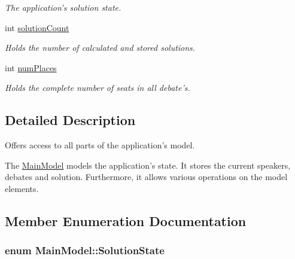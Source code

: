 \begin{DoxyCompactItemize}
\begin{DoxyCompactList}\small\item\em The application's solution state. \end{DoxyCompactList}\item 
\hypertarget{classMainModel_a8c4d8dc4d4aaea3046ab809fc5deffde}{int \hyperlink{classMainModel_a8c4d8dc4d4aaea3046ab809fc5deffde}{solution\-Count}}\label{classMainModel_a8c4d8dc4d4aaea3046ab809fc5deffde}

\begin{DoxyCompactList}\small\item\em Holds the number of calculated and stored solutions. \end{DoxyCompactList}\item 
\hypertarget{classMainModel_ac2724b25facf4662bb205425d8f5998e}{int \hyperlink{classMainModel_ac2724b25facf4662bb205425d8f5998e}{num\-Places}}\label{classMainModel_ac2724b25facf4662bb205425d8f5998e}

\begin{DoxyCompactList}\small\item\em Holds the complete number of seats in all debate's. \end{DoxyCompactList}\end{DoxyCompactItemize}


\subsection{Detailed Description}
Offers access to all parts of the application's model. 

The {\ttfamily \hyperlink{classMainModel}{Main\-Model}} models the application's state. It stores the current speakers, debates and solution. Furthermore, it allows various operations on the model elements. 

\subsection{Member Enumeration Documentation}
\hypertarget{classMainModel_ab0047ea86efa2a40e9aff734f897c330}{
\subsubsection[{Solution\-State}]{\setlength{\rightskip}{0pt plus 5cm}enum {\bf Main\-Model\-::\-Solution\-State}}}\label{classMainModel_ab0047ea86efa2a40e9aff734f897c330}


